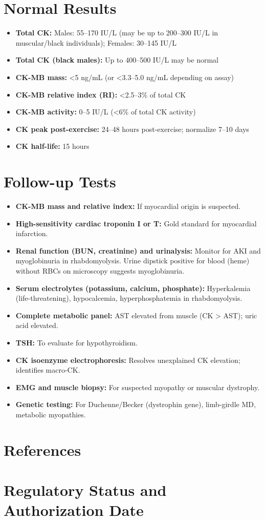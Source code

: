 \section*{Normal Results}
\begin{itemize}
  \item \textbf{Total CK:} Males: 55--170 IU/L (may be up to 200--300 IU/L in muscular/black individuals); Females: 30--145 IU/L
  \item \textbf{Total CK (black males):} Up to 400--500 IU/L may be normal
  \item \textbf{CK-MB mass:} <5 ng/mL (or <3.3--5.0 ng/mL depending on assay)
  \item \textbf{CK-MB relative index (RI):} <2.5--3\% of total CK
  \item \textbf{CK-MB activity:} 0--5 IU/L (<6\% of total CK activity)
  \item \textbf{CK peak post-exercise:} 24--48 hours post-exercise; normalize 7--10 days
  \item \textbf{CK half-life:} 15 hours
\end{itemize}

\section*{Follow-up Tests}
\begin{itemize}
  \item \textbf{CK-MB mass and relative index:} If myocardial origin is suspected.
  \item \textbf{High-sensitivity cardiac troponin I or T:} Gold standard for myocardial infarction.
  \item \textbf{Renal function (BUN, creatinine) and urinalysis:} Monitor for AKI and myoglobinuria in rhabdomyolysis. Urine dipstick positive for blood (heme) without RBCs on microscopy suggests myoglobinuria.
  \item \textbf{Serum electrolytes (potassium, calcium, phosphate):} Hyperkalemia (life-threatening), hypocalcemia, hyperphosphatemia in rhabdomyolysis.
  \item \textbf{Complete metabolic panel:} AST elevated from muscle (CK > AST); uric acid elevated.
  \item \textbf{TSH:} To evaluate for hypothyroidism.
  \item \textbf{CK isoenzyme electrophoresis:} Resolves unexplained CK elevation; identifies macro-CK.
  \item \textbf{EMG and muscle biopsy:} For suspected myopathy or muscular dystrophy.
  \item \textbf{Genetic testing:} For Duchenne/Becker (dystrophin gene), limb-girdle MD, metabolic myopathies.
\end{itemize}

\section*{References}



\clearpage
\section*{Regulatory Status and Authorization Date}

\clearpage
